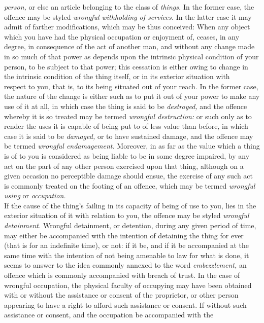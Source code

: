 \documentclass[12pt]{report}
\begin{document}
\emph{person,} or else an article belonging to the class of
\emph{things.} In the former ease, the offence may be styled
\emph{wrongful withholding of services.} In the latter case it may admit
of farther modifications, which may be thus conceived: When any object
which you have had the physical occupation or enjoyment of, ceases, in
any degree, in consequence of the act of another man, and without any
change made in so much of that power as depends upon the intrinsic
physical condition of your person, to be subject to that power; this
cessation is either owing to change in the intrinsic condition of the
thing itself, or in its exterior situation with\\
respect to you, that is, to its being situated out of your reach. In the
former case, the nature of the change is either such as to put it out of
your power to make any use of it at all, in which case the thing is said
to be \emph{destroyed,} and the offence whereby it is so treated may be
termed \emph{wrongful destruction:} or such only as to render the uses
it is capable of being put to of less value than before, in which case
it is said to be \emph{damaged,} or to have sustained damage, and the
offence may be termed \emph{wrongful endamagement.} Moreover, in as far
as the value which a thing is of to you is considered as being liable to
be in some degree impaired, by any act on the part of any other person
exercised upon that thing, although on a given occasion no perceptible
damage should ensue, the exercise of any such act is commonly treated on
the footing of an offence, which may be termed \emph{wrongful using} or
\emph{occupation.}\\
If the cause of the thing's failing in its capacity of being of use to
you, lies in the exterior situation of it with relation to you, the
offence may be styled \emph{wrongful detainment.} Wrongful detainment,
or detention, during any given period of time, may either be accompanied
with the intention of detaining the thing for ever (that is for an
indefinite time), or not: if it be, and if it be accompanied at the same
time with the intention of not being amenable to law for what is done,
it seems to answer to the idea commonly annexed to the word
\emph{embezzlement,} an offence which is commonly accompanied with
breach of trust. In the case of wrongful occupation, the physical
faculty of occupying may have been obtained with or without the
assistance or consent of the proprietor, or other person appearing to
have a right to afford such assistance or consent. If without such
assistance or consent, and the occupation be accompanied with the
\end{document}
